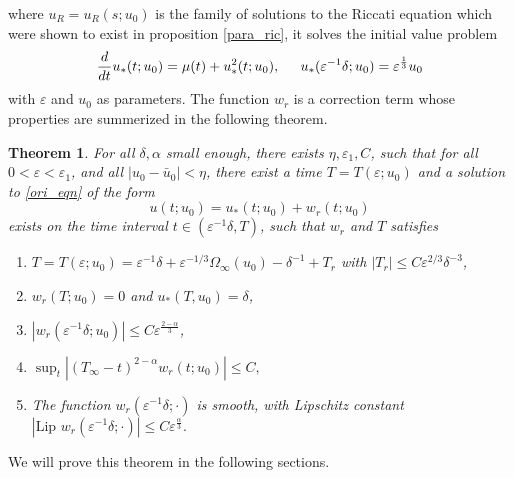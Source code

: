 \documentclass[letterpaper,11pt]{article}
\newcommand{\eps}{\varepsilon}
\numberwithin{equation}{section}
\theoremstyle{plain}
\newtheorem{theorem}{Theorem}[section]
\begin{document}
where $u_R=u_R(s; u_0)$ is the family of solutions to the Riccati equation which were shown to exist in proposition \ref{para_ric}, it solves the initial value problem
\begin{equation}\label{ureq}
\frac{d}{dt}u_*(t; u_0) = \mu(t) + u_*^2(t; u_0), \hspace{0.2in} u_*(\eps^{-1}\delta; u_0) = \eps^{\frac{1}{3}} u_0
\end{equation}
with $\eps$ and $u_0$ as parameters.  The function $w_r$ is a correction term whose properties are summerized in the following theorem.
\begin{theorem}\label{thm_r}
For all $\delta, \alpha$ small enough, there exists $\eta,\eps_1,C$, such that for all $0<\eps <\eps_1$, and all $|u_0 - \bar{u}_0|<\eta$, there exist a time $T=T(\eps;u_0)$ and a solution to \eqref{ori_eqn} of the form
\[
u(t;u_0) = u_*(t; u_0) + w_r(t; u_0)
\]
exists on the time interval $t \in (\eps^{-1}\delta, T)$, such that $w_r$ and $T$ satisfies
\begin{enumerate}[label=\textnormal{(\arabic*)}]
\item \label{thm_r_1}$T=T(\eps;u_0) = \eps^{-1}\delta+\eps^{-1/3}\Omega_\infty(u_0)-\delta^{-1}+T_r$ with $|T_r|\le C\eps^{2/3}\delta^{-3}$,
\item \label{thm_r_2} $w_r(T; u_0) = 0$ and $u_*(T,u_0)=\delta$,
\item \label{thm_r_3} $|w_r(\eps^{-1}\delta; u_0)| \le C\eps^{\frac{2-\alpha}{3}}$,

\item \label{thm_r_4} $\sup_{t} |(T_\infty-t)^{2-\alpha} w_r(t; u_0)| \le C,$

\item \label{thm_r_5} The function $w_r(\eps^{-1}\delta; \cdot)$ is smooth, with Lipschitz constant  $|\text{Lip }w_r(\eps^{-1}\delta; \cdot) |\le C\eps^{\frac{\alpha}{3}} . $

\end{enumerate}

\end{theorem}

We will prove this theorem in the following sections.
\end{document}
